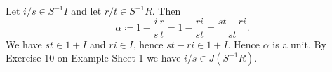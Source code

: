 Let $i/s \in S^{-1}I$ and let $r/t \in S^{-1}R$. Then
\[ \alpha\coloneqq 1 - \frac{i}{s}\frac{r}{t} = 1 - \frac{ri}{st} = \frac{st - ri}{st}. \]
We have $st \in 1 + I$ and $ri \in I$, hence $st - ri \in 1 + I$. Hence
$\alpha$ is a unit. By Exercise 10 on Example Sheet 1 we have $i/s \in J(S^{-1}R)$.
